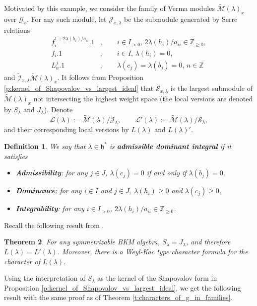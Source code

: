 \documentclass[11pt]{amsart}
\newcommand{\mc}{\mathcal}
\renewcommand{\ge}{\geqslant}
\newcommand{\Z}{\mathbb{Z}}
\newcommand{\h}{\mathfrak{h}}
\numberwithin{equation}{section}
\theoremstyle{plain}
\newtheorem{theorem}{Theorem}[section]
\newtheorem{definition}[theorem]{Definition}
\theoremstyle{definition}
\begin{document}
Motivated by this example, we consider the family of Verma modules $\widetilde{\mc M}(\lambda)_x$ over $\mc G_x$. For any such module, let $\mc J_{x,\lambda}$ be the submodule generated by Serre relations
\begin{align*}
    f_i^{1+2\lambda(h_i)/a_{ii}}.1&,\qquad i\in I_{>0},\, 2\lambda(h_i)/a_{ii}\in\Z_{\ge 0},\\
    f_i.1&,\qquad i\in I, \,\lambda(h_i)=0,\\
    L_n^j.1&,\qquad \lambda(c_j)=\lambda(b_j)=0, \,n\in\Z
\end{align*}
and $\tilde{\mc I}_{x,\lambda}\widetilde{\mc M}(\lambda)_x$. It follows from Proposition \ref{p:kernel_of_Shapovalov_vs_largest_ideal} that $\mc S_{x,\lambda}$ is the largest submodule of $\widetilde{\mc M}(\lambda)_x$ not intersecting the highest weight space (the local versions are denoted by $S_\lambda$ and $J_\lambda$). Denote
$$
\mc L(\lambda):=\widetilde{\mc M}(\lambda)/\mc J_\lambda,\qquad \mc L'(\lambda):=\widetilde{\mc M}(\lambda)/\mc S_\lambda,
$$
and their corresponding local versions by $L(\lambda)$ and $L(\lambda)'$.

\begin{definition}
    We say that $\lambda\in \h^*$ is {\bfseries admissible dominant integral} if it satisfies
\begin{itemize}
    \item {\bfseries Admissibility}: for any $j\in J$, $\lambda(c_j)=0$ if and only if $\lambda(b_j)=0$.
    \item {\bfseries Dominance}: for any $i\in I$ and $j\in J$, $\lambda(h_i)\ge 0$ and $\lambda(c_j)\ge 0$.
    \item {\bfseries Integrability}: for any $i\in I_{>0}$, $2\lambda(h_i)/a_{ii}\in \Z_{\ge 0}$.
\end{itemize}
\end{definition}


Recall the following result from \cite[Theorem 3.17]{Jur96}.
\begin{theorem}
    For any symmetrizable BKM algebra, $S_\lambda=J_\lambda$, and therefore $L(\lambda)=L'(\lambda)$. Moreover, there is a Weyl-Kac type character formula for the character of $L(\lambda)$.
\end{theorem}

Using the interpretation of $S_\lambda$ as the kernel of the Shapovalov form in Proposition \ref{p:kernel_of_Shapovalov_vs_largest_ideal}, we get the following result with the same proof as of Theorem \ref{t:characters_of_g_in_families}.
\end{document}
